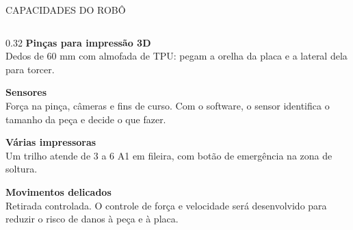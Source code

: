 \documentclass[aspectratio=169, 10pt]{beamer}
\begin{document}
\begin{frame}{CAPACIDADES DO ROBÔ}
\begin{columns}[T]
			\begin{column}{0.32\textwidth}
				\scriptsize
				\textbf{\color{FlexoBlue}Pinças para impressão 3D}\\
				Dedos de 60 mm com almofada de TPU: pegam a orelha da placa e a lateral dela para torcer.
				\vspace{0.18cm}
				
				\textbf{\color{FlexoBlue}Sensores}\\
				Força na pinça, câmeras e fins de curso. Com o software, o sensor identifica o tamanho da peça e decide o que fazer.
				\vspace{0.18cm}
				
				\textbf{\color{FlexoBlue}Várias impressoras}\\
				Um trilho atende de 3 a 6 A1 em fileira, com botão de emergência na zona de soltura.
				\vspace{0.18cm}
				
				\textbf{\color{FlexoBlue}Movimentos delicados}\\
				Retirada controlada. O controle de força e velocidade será desenvolvido para reduzir o risco de danos à peça e à placa.
			\end{column}
		\end{columns}
	\end{frame}
	
\end{document}
